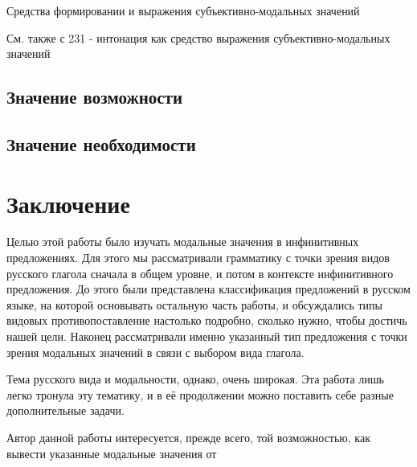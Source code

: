 \documentclass{article}
\begin{document}
Средства формировании и выражения субъективно-модальных значений

См. также с 231 - интонация как средство выражения субъективно-модальных значений


\subsection{Значение возможности}

\subsection{Значение необходимости}



\section{Заключение}

Целью этой работы было изучать модальные значения в инфинитивных предложениях. Для этого мы рассматривали грамматику с точки зрения видов русского глагола сначала в общем уровне, и потом в контексте инфинитивного предложения. До этого были представлена классификация предложений в русском языке, на которой основывать остальную часть работы, и обсуждались типы видовых противопоставление настолько подробно, сколько нужно, чтобы достичь нашей цели. Наконец рассматривали именно указанный тип предложения с точки зрения модальных значений в связи с выбором вида глагола.

Тема русского вида и модальности, однако, очень широкая. Эта работа лишь легко тронула эту тематику, и в её продолжении можно поставить себе разные дополнительные задачи. 

Автор данной работы интересуется, прежде всего, той возможностью, как вывести указанные модальные значения от 






\printbibliography[heading=bibintoc,title={Список использоваемой литературы}]


%
%
\end{document}
